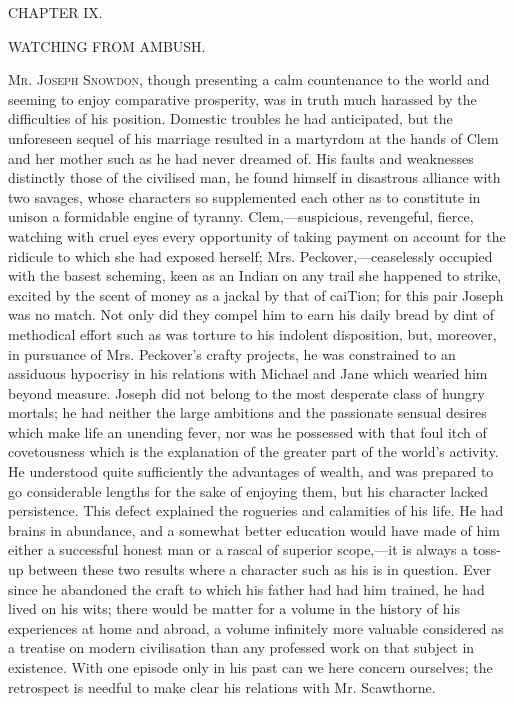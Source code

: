 {}

{CHAPTER IX.}

WATCHING FROM AMBUSH.

\textsc{Mr. Joseph Snowdon}, though presenting a calm countenance to the
world and seeming to enjoy comparative prosperity, was in truth much
harassed by the difficulties of his position. Domestic troubles he had
anticipated, but the unforeseen sequel of his marriage resulted in a
martyrdom at the hands of Clem and her mother such as he had never
dreamed of. His faults and weaknesses distinctly those of the civilised
man, he found himself in disastrous alliance with two savages, whose
characters so supplemented each other as to constitute in unison a
formidable engine of tyranny. Clem,---suspicious, revengeful, fierce,
watching with cruel eyes every opportunity of taking payment on account
for the ridicule to which she had exposed herself; {}Mrs.
Peckover,---ceaselessly occupied with the basest scheming, keen as an
Indian on any trail she happened to strike, excited by the scent of
money as a jackal by that of caiTion; for this pair Joseph was no match.
Not only did they compel him to earn his daily bread by dint of
methodical effort such as was torture to his indolent disposition, but,
moreover, in pursuance of Mrs. Peckover's crafty projects, he was
constrained to an assiduous hypocrisy in his relations with Michael and
Jane which wearied him beyond measure. Joseph did not belong to the most
desperate class of hungry mortals; he had neither the large ambitions
and the passionate sensual desires which make life an unending fever,
nor was he possessed with that foul itch of covetousness which is the
explanation of the greater part of the world's activity. He understood
quite sufficiently the advantages of wealth, and was prepared to go
considerable lengths for the sake of enjoying them, but his character
lacked persistence. This defect explained the rogueries and calamities
of his {}life. He had brains in abundance, and a somewhat better
education would have made of him either a successful honest man or a
rascal of superior scope,---it is always a toss-up between these two
results where a character such as his is in question. Ever since he
abandoned the craft to which his father had had him trained, he had
lived on his wits; there would be matter for a volume in the history of
his experiences at home and abroad, a volume infinitely more valuable
considered as a treatise on modern civilisation than any professed work
on that subject in existence. With one episode only in his past can we
here concern ourselves; the retrospect is needful to make clear his
relations with Mr. Scawthorne.

